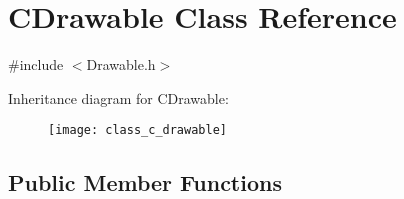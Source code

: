 \hypertarget{class_c_drawable}{\section{C\+Drawable Class Reference}
\label{class_c_drawable}
}


{\ttfamily \#include $<$Drawable.\+h$>$}

Inheritance diagram for C\+Drawable\+:\begin{figure}[H]
\begin{center}
\leavevmode
\texttt{[image: class\_c\_drawable]}
\end{center}
\end{figure}
\subsection*{Public Member Functions}
